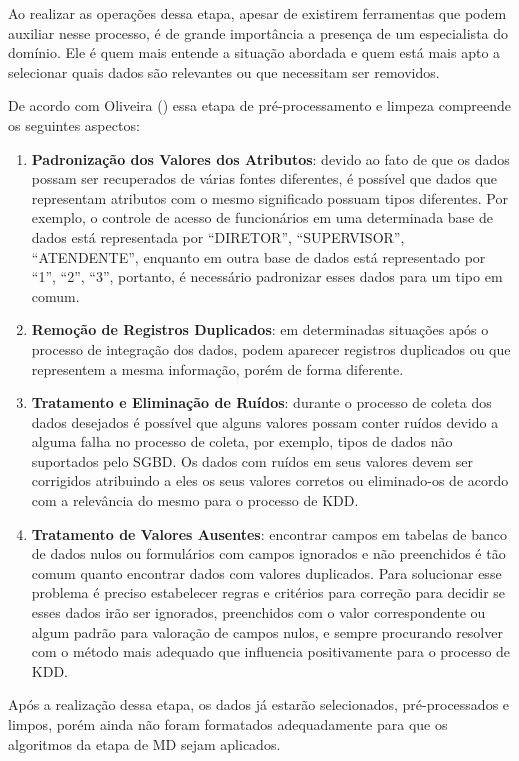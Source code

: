 Ao realizar as operações dessa etapa, apesar de existirem ferramentas que podem auxiliar nesse processo, é de grande importância a presença de um especialista do domínio. Ele é quem mais entende a situação abordada e quem está mais apto a selecionar quais dados são relevantes ou que necessitam ser removidos.

De acordo com Oliveira (\citeyear{oliveira2000processo}) essa etapa de pré-processamento e limpeza
compreende os seguintes aspectos:

\begin{enumerate}
\item \textbf{Padronização dos Valores dos Atributos}: devido ao fato de que os dados possam ser recuperados de várias fontes diferentes, é possível que dados que representam atributos com o mesmo significado possuam tipos diferentes. Por exemplo, o controle de acesso de funcionários em uma determinada base de dados está representada por “DIRETOR”, “SUPERVISOR”, “ATENDENTE”, enquanto em outra base de dados está representado por “1”, “2”, “3”, portanto, é necessário padronizar esses dados para um tipo em comum.
\item \textbf{Remoção de Registros Duplicados}: em determinadas situações após o processo de integração dos dados, podem aparecer registros duplicados ou que representem a mesma informação, porém de forma diferente.
\item \textbf{Tratamento e Eliminação de Ruídos}: durante o processo de coleta dos dados desejados é possível que alguns valores possam conter ruídos devido a alguma falha no processo de coleta, por exemplo, tipos de dados não suportados pelo SGBD. Os dados com ruídos em seus valores devem ser corrigidos atribuindo a eles os seus valores corretos ou eliminado-os de acordo com a relevância do mesmo para o processo de KDD.
\item \textbf{Tratamento de Valores Ausentes}: encontrar campos em tabelas de banco de dados nulos ou formulários com campos ignorados e não preenchidos é tão comum quanto encontrar dados com valores duplicados. Para solucionar esse problema é preciso estabelecer regras e critérios para correção para decidir se esses dados irão ser ignorados, preenchidos com o valor correspondente ou algum padrão para valoração de campos nulos, e sempre procurando resolver com o método mais adequado que influencia positivamente para o processo de KDD.
\end{enumerate}

Após a realização dessa etapa, os dados já estarão selecionados, pré-processados e limpos, porém ainda não foram formatados adequadamente para que os algoritmos da etapa de MD sejam aplicados.

